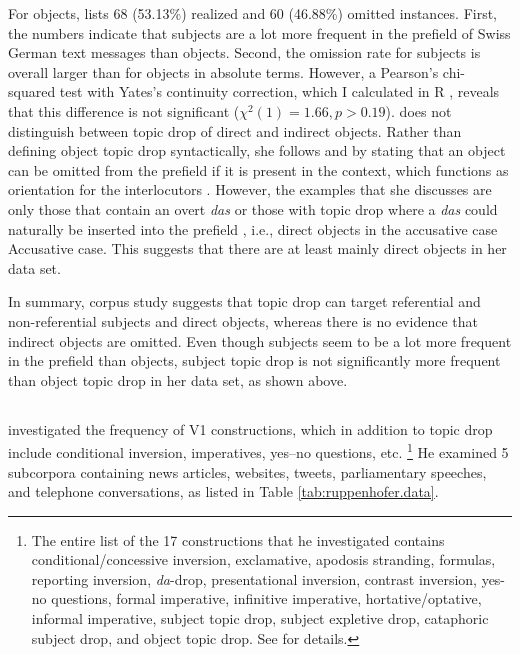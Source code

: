 For objects, \citet[125--126]{frick2017} lists 68 (53.13\%) realized and 60 (46.88\%) omitted instances.
First, the numbers indicate that subjects are a lot more frequent in the prefield of Swiss German text messages than objects.
Second, the omission rate for subjects is overall larger than for objects in absolute terms.
However, a Pearson's chi-squared test with Yates's continuity correction, which I calculated in R \citep{rcoreteam2021}, reveals that this difference is not significant ($\chi^2(1) = 1.66, p > 0.19$).
\citet{frick2017} does not distinguish between topic drop of direct and indirect objects.
Rather than defining object topic drop syntactically, she follows \citet{auer1993} and \citet{zifonun.etal1997} by stating that an object can be omitted from the prefield if it is present in the context, which functions as orientation for the interlocutors \citep[125]{frick2017}.
However, the examples that she discusses are only those that contain an overt \textit{das} or those with topic drop where a \textit{das} could naturally be inserted into the prefield \citep[126--127]{frick2017}, i.e., direct objects in the accusative case Accusative case.
This suggests that there are at least mainly direct objects in her data set.

In summary,  corpus study suggests that topic drop can target referential and non-referential subjects and direct objects, whereas there is no evidence that indirect objects are omitted.
Even though subjects seem to be a lot more frequent in the prefield than objects, subject topic drop is not significantly more frequent than object topic drop in her data set, as shown above.

\subsection{\citet{ruppenhofer2018}}
\citet{ruppenhofer2018} investigated the frequency of V1 constructions, which in addition to topic drop include conditional inversion, imperatives, yes–no questions, etc.%
\footnote{The entire list of the 17 constructions that he investigated contains conditional/concessive inversion, exclamative, apodosis stranding, formulas, reporting inversion, \textit{da}-drop, presentational inversion, contrast inversion, yes-no questions, formal imperative, infinitive imperative, hortative/optative, informal imperative, subject topic drop, subject expletive  drop, cataphoric subject drop, and object topic drop.
See \citet[218]{ruppenhofer2018} for details.}
%
He examined 5 subcorpora containing news articles, websites, tweets, parliamentary speeches, and telephone conversations, as listed in Table \ref{tab:ruppenhofer.data}.

